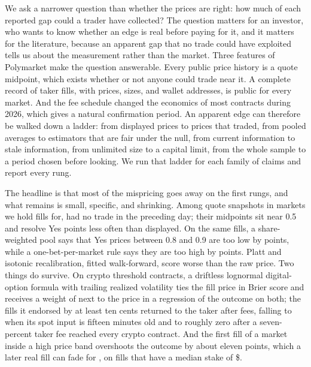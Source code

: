 \documentclass[format=acmsmall, review=false]{acmart}
\begin{document}
We ask a narrower question than whether the prices are right: how much of each reported gap could a trader have collected? The question matters for an investor, who wants to know whether an edge is real before paying for it, and it matters for the literature, because an apparent gap that no trade could have exploited tells us about the measurement rather than the market. Three features of Polymarket make the question answerable. Every public price history is a quote midpoint, which exists whether or not anyone could trade near it. A complete record of taker fills, with prices, sizes, and wallet addresses, is public for every market. And the fee schedule changed the economics of most contracts during 2026, which gives a natural confirmation period. An apparent edge can therefore be walked down a ladder: from displayed prices to prices that traded, from pooled averages to estimators that are fair under the null, from current information to stale information, from unlimited size to a capital limit, from the whole sample to a period chosen before looking. We run that ladder for each family of claims and report every rung.

The headline is that most of the mispricing goes away on the first rungs, and what remains is small, specific, and shrinking. Among quote snapshots in markets we hold fills for, \dormantShare{} had no trade in the preceding day; their midpoints sit near 0.5 and resolve Yes \dormantGap{} points less often than displayed. On the same fills, a share-weighted pool says that Yes prices between 0.8 and 0.9 are too low by \pooledHighMag{} points, while a one-bet-per-market rule says they are too high by \ftHighMag{} points. Platt and isotonic recalibration, fitted walk-forward, score worse than the raw price. Two things do survive. On \thrMarkets{} crypto threshold contracts, a driftless lognormal digital-option formula with trailing realized volatility ties the fill price in Brier score and receives a weight of \encModel{} next to the price in a regression of the outcome on both; the fills it endorsed by at least ten cents returned \backedOne{} to the taker after fees, falling to \backedFifteen{} when its spot input is fifteen minutes old and to roughly zero after a seven-percent taker fee reached every crypto contract. And the first fill of a market inside a high price band overshoots the outcome by about eleven points, which a later real fill can fade for \fadeMid{}, on fills that have a median stake of \$\fadeFillUsd{}.
\end{document}
